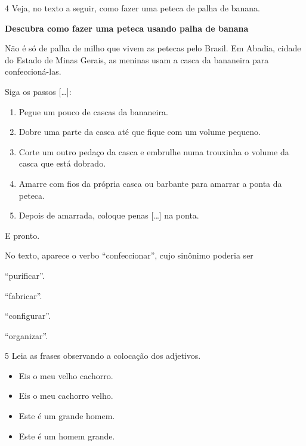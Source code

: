 \pagebreak
\num{4} Veja, no texto a seguir, como fazer uma peteca de palha de banana.

\begin{myquote}
\textbf{Descubra como fazer uma peteca usando palha de banana}

Não é só de palha de milho que vivem as petecas pelo Brasil. Em Abadia, cidade do Estado de
Minas Gerais, as meninas usam a casca da bananeira para confeccioná-las.

Siga os passos {[}\ldots{}{]}:

\begin{enumerate}
\item Pegue um pouco de cascas da bananeira.

\item Dobre uma parte da casca até que fique com um volume pequeno.

\item Corte um outro pedaço da casca e embrulhe numa trouxinha o volume da
casca que está dobrado.

\item Amarre com fios da própria casca ou barbante para amarrar a ponta da
peteca.

\item Depois de amarrada, coloque penas {[}\ldots{}{]} na ponta.
\end{enumerate}

E pronto.

\end{myquote}

No texto, aparece o verbo ``confeccionar'', cujo sinônimo poderia ser

\begin{escolha}
\item ``purificar''.

\item ``fabricar''.

\item ``configurar''.

\item ``organizar''.
\end{escolha}

\pagebreak
\num{5} Leia as frases observando a colocação dos adjetivos.

\begin{myquote}
\begin{itemize}
\item Eis o meu velho cachorro.

\item Eis o meu cachorro velho.

\item Este é um grande homem.

\item Este é um homem grande.
\end{itemize}
\end{myquote}

